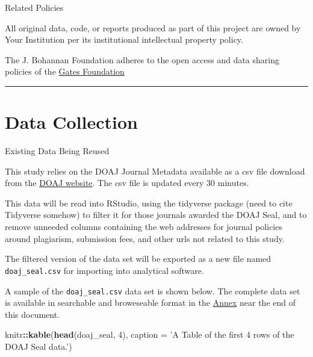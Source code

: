 \documentclass[]{article}
\newenvironment{Shaded}{\begin{snugshade}}{\end{snugshade}}
\newcommand{\KeywordTok}[1]{\textcolor[rgb]{0.13,0.29,0.53}{\textbf{#1}}}
\newcommand{\DataTypeTok}[1]{\textcolor[rgb]{0.13,0.29,0.53}{#1}}
\newcommand{\DecValTok}[1]{\textcolor[rgb]{0.00,0.00,0.81}{#1}}
\newcommand{\StringTok}[1]{\textcolor[rgb]{0.31,0.60,0.02}{#1}}
\newcommand{\OperatorTok}[1]{\textcolor[rgb]{0.81,0.36,0.00}{\textbf{#1}}}
\newcommand{\NormalTok}[1]{#1}
\begin{document}
Related Policies

All original data, code, or reports produced as part of this project are
owned by Your Institution per its institutional intellectual property
policy.

The J. Bohannan Foundation adheres to the open access and data sharing
policies of the
\href{https://www.gatesfoundation.org/How-We-Work/General-Information/Open-Access-Policy}{Gates
Foundation}

\begin{center}\rule{0.5\linewidth}{\linethickness}\end{center}

\section{Data Collection}\label{data-collection}

Existing Data Being Reused

This study relies on the DOAJ Journal Metadata available as a csv file
download from the \href{https://doaj.org/faq\#metadata}{DOAJ website}.
The csv file is updated every 30 minutes.

This data will be read into RStudio, using the tidyverse package (need
to cite Tidyverse somehow) to filter it for those journals awarded the
DOAJ Seal, and to remove unneeded columns containing the web addresses
for journal policies around plagiarism, submission fees, and other urls
not related to this study.

The filtered version of the data set will be exported as a new file
named \texttt{doaj\_seal.csv} for importing into analytical software.

A sample of the \texttt{doaj\_seal.csv} data set is shown below. The
complete data set is available in searchable and broweseable format in
the \protect\hyperlink{annex-table}{Annex} near the end of this
document.

\begin{Shaded}
\begin{Highlighting}[]
\NormalTok{knitr}\OperatorTok{::}\KeywordTok{kable}\NormalTok{(}\KeywordTok{head}\NormalTok{(doaj_seal, }\DecValTok{4}\NormalTok{), }\DataTypeTok{caption =} \StringTok{'A Table of the first 4 rows of the DOAJ Seal data.'}\NormalTok{)}
\end{Highlighting}
\end{Shaded}
\end{document}
